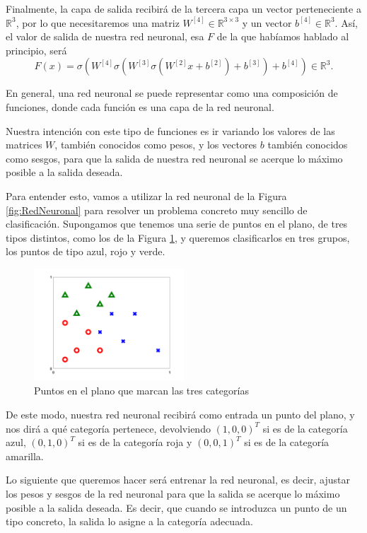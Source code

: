 \documentclass[a4paper,11pt,spanish, twoside, leqno]{tfg-uam}
\theoremstyle{definition}
\begin{document}
Finalmente, la capa de salida recibirá de la tercera capa un vector perteneciente a $\mathbb{R}^3$, por lo que necesitaremos una matriz $W^{[4]}\in\mathbb{R}^{3\times3}$ y un vector $b^{[4]}\in\mathbb{R}^3$. Así, el valor de salida de nuestra red neuronal, esa $F$ de la que habíamos hablado al principio, será
\begin{equation}
    F(x)=\sigma(W^{[4]}\sigma(W^{[3]}\sigma(W^{[2]}x+b^{[2]})+b^{[3]})+b^{[4]})\in\mathbb{R}^3.
\end{equation}\label{eq:RedNeuronal}

En general, una red neuronal se puede representar como una composición de funciones, donde cada función es una capa de la red neuronal. 

Nuestra intención con este tipo de funciones es ir variando los valores de las matrices $W$, también conocidos como pesos, y los vectores $b$ también conocidos como sesgos, para que la salida de nuestra red neuronal se acerque lo máximo posible a la salida deseada. 

Para entender esto, vamos a utilizar la red neuronal de la Figura \ref{fig:RedNeuronal} para resolver un problema concreto muy sencillo de clasificación. Supongamos que tenemos una serie de puntos en el plano, de tres tipos distintos, como los de la Figura \ref{fig:Clasificacion}, y queremos clasificarlos en tres grupos, los puntos de tipo azul, rojo y verde.


\begin{figure}
    \centering
    \includegraphics[width=0.5\textwidth]{Figuras/pic_xy.png}
    \caption{Puntos en el plano que marcan las tres categorías}
    \label{fig:Clasificacion}
\end{figure}

De este modo, nuestra red neuronal recibirá como entrada un punto del plano, y nos dirá a qué categoría pertenece, devolviendo $(1,0,0)^T$ si es de la categoría azul, $(0,1,0)^T$ si es de la categoría roja y $(0,0,1)^T$ si es de la categoría amarilla.

Lo siguiente que queremos hacer será entrenar la red neuronal, es decir, ajustar los pesos y sesgos de la red neuronal para que la salida se acerque lo máximo posible a la salida deseada. Es decir, que cuando se introduzca un punto de un tipo concreto, la salida lo asigne a la categoría adecuada. 
\end{document}
